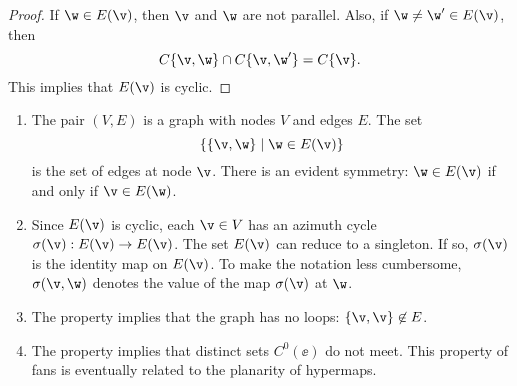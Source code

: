 \begin{proof}  If $\w\in E(\v)$, then $\v$ and $\w$ are not parallel.
Also, if $\w\ne \w'\in E(\v)$, then
\[ 
C\{\v,\w\}\cap C\{\v,\w'\} = C\{\v\}.
\] 
This implies that $E(\v)$ is cyclic.
\end{proof}

\begin{remark}\label{rem:fan}
\hfill\break
\begin{enumerate}\wasitemize 
\item The pair $(V,E)$ is a graph with nodes $V$ and edges $E$.  The set
\[ \{\{\v,\w\}\mid \w\in E(\v)\}\]  is
the set of edges at node $\v$.  There is an evident symmetry: $\w\in
E(\v)$ if and only if $\v\in E(\w)$.
%
\item {}%
  Since $E(\v)$ is cyclic, each $\v\in V$ has an azimuth cycle
  $\sigma(\v):E(\v)\to E(\v)$.  The set $E(\v)$ can reduce to a
  singleton. If so, $\sigma(\v)$ is the identity map on $E(\v)$.
%
To make the notation less cumbersome, $\sigma(\v,\w)$ denotes the
value of the map $\sigma(\v)$ at $\w$.
%
\item The property  implies that the graph has no
loops: $\{\v,\v\}\not\in E$.
%
\item The property  implies that distinct sets
$C^0(\ee)$ do not meet.  This property of fans is eventually
related to the  planarity of hypermaps.
%
%
%
%
%
%
\end{enumerate}\wasitemize 
\end{remark}

